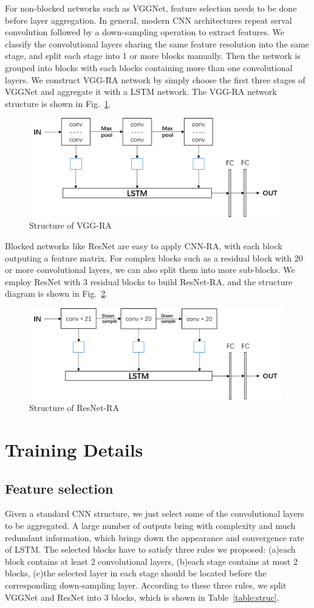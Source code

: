\documentclass[runningheads]{llncs}
\begin{document}
For non-blocked networks such as VGGNet, feature selection needs to be done before layer aggregation. In general, modern CNN architectures repeat serval convolution followed by a down-sampling operation to extract features. We classify the convolutional layers sharing the same feature resolution into the same stage, and split each stage into 1 or more blocks manually. Then the network is grouped into blocks with each blocks containing more than one convolutional layers. We construct VGG-RA network by simply choose the first three stages of VGGNet and aggregate it with a LSTM network. The VGG-RA network structure is shown in Fig.~\ref{fig:VGG-RA}.
\begin{figure}  
	\centering
	\includegraphics[width=11cm]{Figures/VGG-RA.png}
	\caption{Structure of VGG-RA}
	\label{fig:VGG-RA}
\end{figure}

Blocked networks like ResNet are easy to apply CNN-RA, with each block outputing a feature matrix. For complex blocks such as a residual block with 20 or more convolutional layers, we can also split them into more sub-blocks. We employ ResNet with 3 residual blocks to build ResNet-RA, and the structure diagram is shown in Fig.~\ref{fig:ResNet-RA}.
\begin{figure}  
	\centering
	\includegraphics[width=11cm]{Figures/ResNet-RA.png}
	\caption{Structure of ResNet-RA}
	\label{fig:ResNet-RA}
\end{figure}

\section{Training Details}
\subsection{Feature selection}
Given a standard CNN structure, we just select some of the convolutional layers to be aggregated. A large number of outputs bring with complexity and much redundant information, which brings down the appearance and convergence rate of LSTM. The selected blocks have to satisfy three rules we proposed: (a)each block contains at least 2 convolutional layers, (b)each stage contains at most 2 blocks, (c)the selected layer in each stage should be located before the corresponding down-sampling layer. According to these three rules, we split VGGNet and ResNet into 3 blocks, which is shown in Table~\ref{table:struc}.
\end{document}
